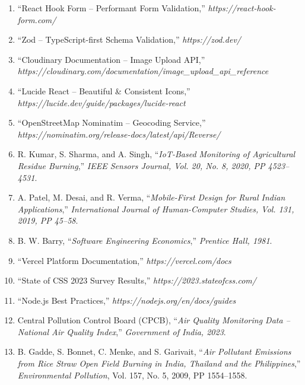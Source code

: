 \documentclass[a4paper,12pt,oneside]{report}
\let\originalitem\item
\renewcommand{\item}{\Needspace{10\baselineskip}\originalitem}
\begin{document}
\begin{enumerate}
    \item[{[14]}] ``React Hook Form -- Performant Form Validation,'' \textit{https://react-hook-form.com/}

    \item[{[15]}] ``Zod -- TypeScript-first Schema Validation,'' \textit{https://zod.dev/}

    \item[{[16]}] ``Cloudinary Documentation -- Image Upload API,'' \textit{https://cloudinary.com/documentation/image\_upload\_api\_reference}

    \item[{[17]}] ``Lucide React -- Beautiful \& Consistent Icons,'' \textit{https://lucide.dev/guide/packages/lucide-react}

    \item[{[18]}] ``OpenStreetMap Nominatim -- Geocoding Service,'' \textit{https://nominatim.org/release-docs/latest/api/Reverse/}

    \item[{[19]}] R. Kumar, S. Sharma, and A. Singh, ``\textit{IoT-Based Monitoring of Agricultural Residue Burning},'' \textit{IEEE Sensors Journal, Vol. 20, No. 8, 2020, PP 4523--4531}.

    \item[{[20]}] A. Patel, M. Desai, and R. Verma, ``\textit{Mobile-First Design for Rural Indian Applications},'' \textit{International Journal of Human-Computer Studies, Vol. 131, 2019, PP 45--58}.

    \item[{[21]}] B. W. Barry, ``\textit{Software Engineering Economics},'' \textit{Prentice Hall, 1981}.

    \item[{[22]}] ``Vercel Platform Documentation,'' \textit{https://vercel.com/docs}

    \item[{[23]}] ``State of CSS 2023 Survey Results,'' \textit{https://2023.stateofcss.com/}

    \item[{[24]}] ``Node.js Best Practices,'' \textit{https://nodejs.org/en/docs/guides}

    \item[{[25]}] Central Pollution Control Board (CPCB), ``\textit{Air Quality Monitoring Data -- National Air Quality Index},'' \textit{Government of India, 2023}.

    \item[{[26]}] \label{bib:gadde2009} B. Gadde, S. Bonnet, C. Menke, and S. Garivait, ``\textit{Air Pollutant Emissions from Rice Straw Open Field Burning in India, Thailand and the Philippines},'' \textit{Environmental Pollution}, Vol. 157, No. 5, 2009, PP 1554--1558.


\end{enumerate}
\end{document}

